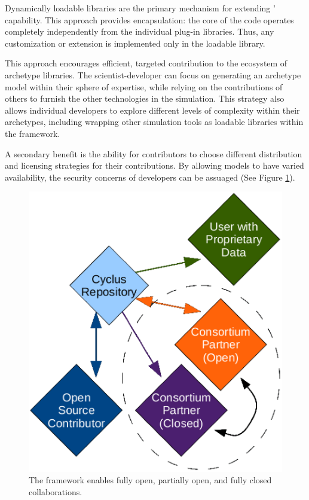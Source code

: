 Dynamically loadable libraries are the primary mechanism for extending \Cyclus' capability. 
This approach provides encapsulation: the core of the code operates
completely independently from the individual plug-in libraries. Thus, any
customization or extension is implemented only in the loadable
library. 

This approach encourages efficient, targeted contribution to the ecosystem of 
archetype libraries.  The 
scientist-developer can focus on generating an archetype model within their
sphere of expertise, while relying on the contributions of others to furnish
the other technologies in the simulation.  This strategy also allows individual developers to
explore different levels of complexity within their archetypes, including
wrapping other simulation tools as loadable libraries within the \Cyclus
framework.

A secondary benefit is the ability for
contributors to choose different distribution and licensing strategies
for their contributions. By allowing models to have varied
availability, the security concerns of developers can be
assuaged (See Figure \ref{fig:modifiedopen}).

\begin{figure}[htbp!]
\begin{center}
\includegraphics{./images/modifiedopen.eps}
\end{center}
\caption{The \Cyclus framework enables fully open, partially open, and fully
closed collaborations\cite{carlsen_cyclus_2014}.}
\label{fig:modifiedopen}
\end{figure}

